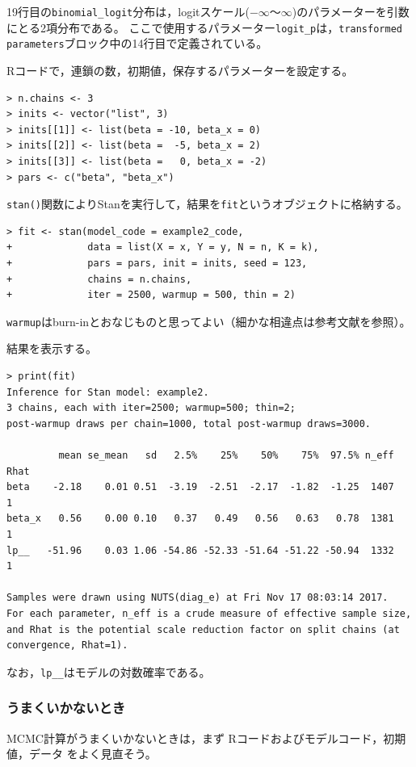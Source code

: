 \documentclass[11pt,uplatex]{jsarticle}
\begin{document}
19行目の\texttt{binomial\_logit}分布は，logitスケール($-\infty$〜$\infty$)のパラメーターを引数にとる2項分布である。
ここで使用するパラメーター\texttt{logit\_p}は，\texttt{transformed parameters}ブロック中の14行目で定義されている。

\textsf{R}コードで，連鎖の数，初期値，保存するパラメーターを設定する。
\begin{lstlisting}
> n.chains <- 3
> inits <- vector("list", 3)
> inits[[1]] <- list(beta = -10, beta_x = 0)
> inits[[2]] <- list(beta =  -5, beta_x = 2)
> inits[[3]] <- list(beta =   0, beta_x = -2)
> pars <- c("beta", "beta_x")
\end{lstlisting}

\texttt{stan()}関数により\textsf{Stan}を実行して，結果を\texttt{fit}というオブジェクトに格納する。
\begin{lstlisting}
> fit <- stan(model_code = example2_code,
+             data = list(X = x, Y = y, N = n, K = k),
+             pars = pars, init = inits, seed = 123,
+             chains = n.chains,
+             iter = 2500, warmup = 500, thin = 2)
\end{lstlisting}
\noindent
\texttt{warmup}はburn-inとおなじものと思ってよい（細かな相違点は参考文献\cite{BDA3}を参照）。

結果を表示する。
\begin{lstlisting}[basicstyle=\ttfamily\footnotesize]
> print(fit)
Inference for Stan model: example2.
3 chains, each with iter=2500; warmup=500; thin=2; 
post-warmup draws per chain=1000, total post-warmup draws=3000.

         mean se_mean   sd   2.5%    25%    50%    75%  97.5% n_eff Rhat
beta    -2.18    0.01 0.51  -3.19  -2.51  -2.17  -1.82  -1.25  1407    1
beta_x   0.56    0.00 0.10   0.37   0.49   0.56   0.63   0.78  1381    1
lp__   -51.96    0.03 1.06 -54.86 -52.33 -51.64 -51.22 -50.94  1332    1

Samples were drawn using NUTS(diag_e) at Fri Nov 17 08:03:14 2017.
For each parameter, n_eff is a crude measure of effective sample size,
and Rhat is the potential scale reduction factor on split chains (at 
convergence, Rhat=1).
\end{lstlisting}
\noindent
なお，\texttt{lp\_\_}はモデルの対数確率である。

\subsubsection{うまくいかないとき}
MCMC計算がうまくいかないときは，まず \textsf{R}コードおよびモデルコード，初期値，データ
をよく見直そう。
\end{document}

